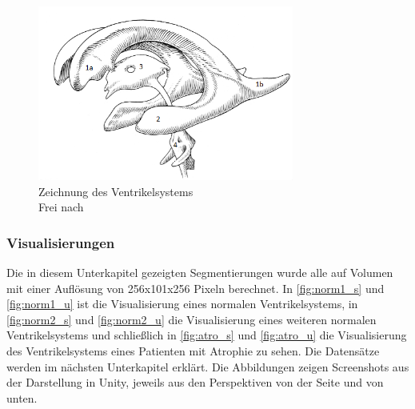 \begin{figure}[!h] 
\centering 
\includegraphics[width=0.75\textwidth]{Logos/Ventrikelsystem_V3.png}
\caption{Zeichnung des Ventrikelsystems  \\  Frei nach \protect\cite{ventrik}} 
\label{fig:ventrik} 
\end{figure}


\subsubsection{Visualisierungen}

Die in diesem Unterkapitel gezeigten Segmentierungen wurde alle auf Volumen mit einer Auflösung von 256x101x256 Pixeln berechnet. In \autoref{fig:norm1_s} und \autoref{fig:norm1_u} ist die Visualisierung eines normalen Ventrikelsystems, in \autoref{fig:norm2_s} und \autoref{fig:norm2_u} die Visualisierung eines weiteren normalen Ventrikelsystems und schließlich in \autoref{fig:atro_s} und \autoref{fig:atro_u} die Visualisierung des Ventrikelsystems eines Patienten mit Atrophie zu sehen. Die Datensätze werden im nächsten Unterkapitel erklärt. Die Abbildungen zeigen Screenshots aus der Darstellung in Unity, jeweils aus den Perspektiven von der Seite und von unten.


